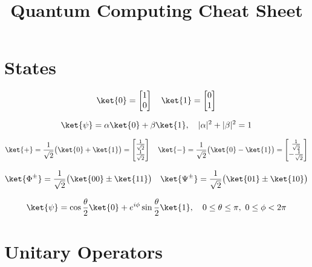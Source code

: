 \documentclass[12pt]{article}
\title{\vspace{-1.2cm}Quantum Computing Cheat Sheet}
\date{}
\begin{document}
\maketitle

\vspace{-36pt}
\section{States}

\begin{equation*}
\ket{0} = \begin{bmatrix} 1 \\ 0 \end{bmatrix}
\quad
\ket{1} = \begin{bmatrix} 0 \\ 1 \end{bmatrix}
\end{equation*}

\begin{equation*}
\ket{\psi} = \alpha \ket{0} + \beta \ket{1} ,
\quad
|\alpha|^2 + |\beta|^2 = 1
\end{equation*}

\begin{equation*}
\ket{+} = \frac{1}{\sqrt{2}} \big( \ket{0} + \ket{1} \big) 
= \begin{bmatrix} \frac{1}{\sqrt{2}} \\ \frac{1}{\sqrt{2}} \end{bmatrix}
\quad
\ket{-} = \frac{1}{\sqrt{2}} \big( \ket{0} - \ket{1} \big) 
= \begin{bmatrix} \frac{1}{\sqrt{2}} \\ -\frac{1}{\sqrt{2}} \end{bmatrix}
\end{equation*}

\begin{equation*}
\ket{\Phi^\pm} = \frac{1}{\sqrt{2}} \big( \ket{00} \pm \ket{11} \big)
\quad
\ket{\Psi^\pm} = \frac{1}{\sqrt{2}} \big( \ket{01} \pm \ket{10} \big)
\end{equation*}

\begin{equation*}
\ket{\psi} = \cos{\frac{\theta}{2}} \ket{0} + e^{i\phi} \sin{\frac{\theta}{2}} \ket{1} ,
\quad
0 \le \theta \le \pi, \
0 \le \phi < 2\pi
\end{equation*}

\section{Unitary Operators}
\end{document}
